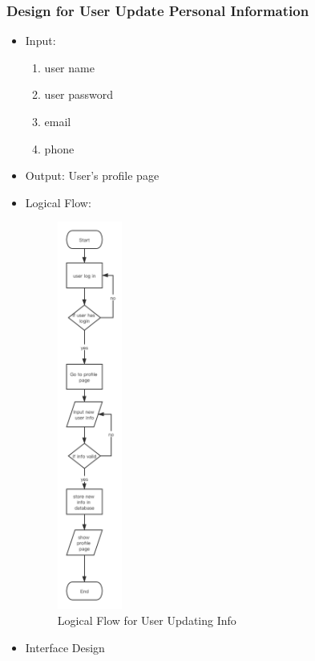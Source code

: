 \documentclass[16pt]{scrreprt}
\begin{document}
\subsubsection{Design for User Update Personal Information}
\begin{itemize}
    \item Input: 
    \begin{enumerate}
        \item user name
        \item user password
        \item email
        \item phone
    \end{enumerate}
    \item Output: User's profile page
    \item Logical Flow:
     \begin{figure}[H]
    \centering
    \includegraphics[width=0.2\textwidth]{diagrams/updateinfo.png}
    \caption{Logical Flow for User Updating Info}
\end{figure}
    \item Interface Design

\end{itemize}
\end{document}
